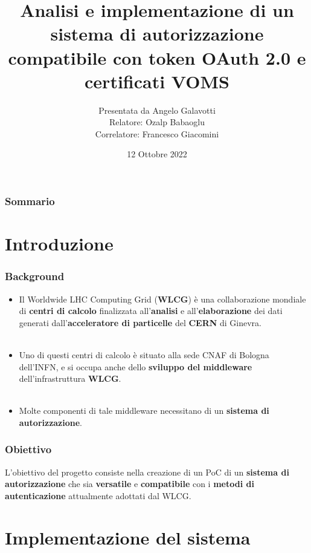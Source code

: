 \documentclass{beamer}
\title[] %
{Analisi e implementazione di un sistema di
autorizzazione compatibile con token
OAuth 2.0 e certificati VOMS}
\author[Angelo Galavotti] %
{Presentata da Angelo Galavotti\\ 
Relatore: Ozalp Babaoglu\\
Correlatore: Francesco Giacomini}
\institute[] %
{
  Corso di Laurea in Informatica\\
  Alma Mater Studiorum Università di Bologna
}
\date[12 Ottobre 2022] %
{12 Ottobre 2022}
\begin{document}
\frame{\titlepage}


\begin{frame}
\frametitle{Sommario}
\tableofcontents
\end{frame}


\section{Introduzione}

\begin{frame}
\frametitle{Background}

\begin{itemize}
  \item Il Worldwide LHC Computing Grid (\textbf{WLCG}) è una collaborazione mondiale di \textbf{centri di calcolo}
  finalizzata all'\textbf{analisi} e all'\textbf{elaborazione} dei dati generati dall'\textbf{acceleratore di particelle} del \textbf{CERN} di Ginevra.
  \\~\
  \item Uno di questi centri di calcolo è situato alla sede CNAF di Bologna dell'INFN, e si occupa
   anche dello \textbf{sviluppo del middleware} dell'infrastruttura \textbf{WLCG}.
   \\~\ 
  \item Molte componenti di tale middleware necessitano di un \textbf{sistema di autorizzazione}. 

\end{itemize}
\end{frame}



\begin{frame}
  \frametitle{Obiettivo}
  L'obiettivo del progetto consiste nella creazione di un PoC di un \textbf{sistema di autorizzazione} che sia \textbf{versatile} e \textbf{compatibile} 
  con i \textbf{metodi di autenticazione} attualmente adottati dal WLCG.
\end{frame}

\section{Implementazione del sistema}
\end{document}
